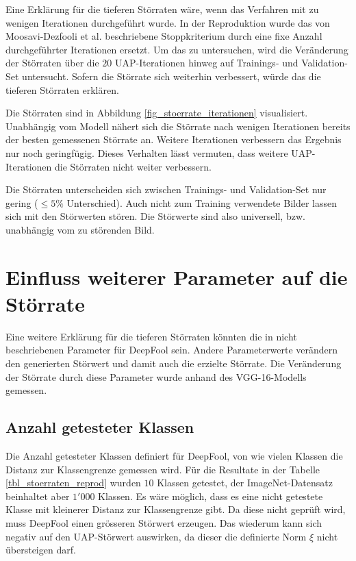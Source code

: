 \documentclass{FFHS_Thesis_Additions/ffhsthesis}
\begin{document}
Eine Erklärung für die tieferen Störraten wäre, wenn das Verfahren mit zu wenigen Iterationen durchgeführt wurde. 
In der Reproduktion wurde das von Moosavi-Dezfooli et al. beschriebene Stoppkriterium durch eine fixe Anzahl durchgeführter Iterationen ersetzt. 
Um das zu untersuchen, wird die Veränderung der Störraten über die $20$ UAP-Iterationen hinweg auf Trainings- und Validation-Set untersucht. 
Sofern die Störrate sich weiterhin verbessert, würde das die tieferen Störraten erklären.

Die Störraten sind in Abbildung \ref{fig_stoerrate_iterationen} visualisiert. 
Unabhängig vom Modell nähert sich die Störrate nach wenigen Iterationen bereits der besten gemessenen Störrate an.
Weitere Iterationen verbessern das Ergebnis nur noch geringfügig. Dieses Verhalten lässt vermuten, dass weitere UAP-Iterationen die Störraten nicht weiter verbessern.

Die Störraten unterscheiden sich zwischen Trainings- und Validation-Set nur gering ($\leq5\%$ Unterschied). 
Auch nicht zum Training verwendete Bilder lassen sich mit den Störwerten stören. Die Störwerte sind also universell, bzw. unabhängig vom zu störenden Bild.



\section{Einfluss weiterer Parameter auf die Störrate}

Eine weitere Erklärung für die tieferen Störraten könnten die in \cite{moosavi-dezfooli_universal_2017-1} nicht beschriebenen Parameter für DeepFool sein. 
Andere Parameterwerte verändern den generierten Störwert und damit auch die erzielte Störrate.
Die Veränderung der Störrate durch diese Parameter wurde anhand des VGG-16-Modells gemessen.

\subsection{Anzahl getesteter Klassen}

Die Anzahl getesteter Klassen definiert für DeepFool, von wie vielen Klassen die Distanz zur Klassengrenze gemessen wird. 
Für die Resultate in der Tabelle \ref{tbl_stoerraten_reprod} wurden $10$ Klassen getestet, der ImageNet-Datensatz beinhaltet aber $1'000$ Klassen. 
Es wäre möglich, dass es eine nicht getestete Klasse mit kleinerer Distanz zur Klassengrenze gibt. 
Da diese nicht geprüft wird, muss DeepFool einen grösseren Störwert erzeugen. 
Das wiederum kann sich negativ auf den UAP-Störwert auswirken, da dieser die definierte Norm $\xi$ nicht übersteigen darf.
\end{document}
